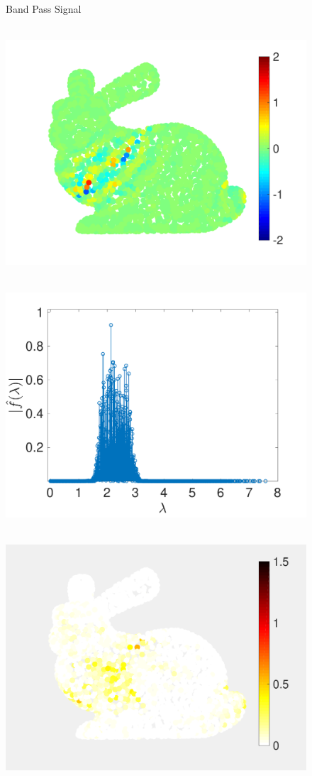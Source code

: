\documentclass[a4paper]{article}
\theoremstyle{definition}
\begin{document}
\begin{figure}[bth]
\begin{minipage}[m]{0.16\linewidth}
\end{minipage}\\
\begin{minipage}[m]{0.16\linewidth}
\centerline{\small{Band Pass Signal}}
\end{minipage}
\begin{minipage}[m]{0.16\linewidth}
\centerline{~~\includegraphics[width=.85\linewidth]{fig_band_pass_signal_bunny}}
\end{minipage}
\begin{minipage}[m]{0.16\linewidth}
\centerline{~~\includegraphics[width=.85\linewidth]{fig_band_pass_signal_spectral_bunny}}
\end{minipage}
\begin{minipage}[m]{0.16\linewidth}
\centerline{~~\includegraphics[width=.85\linewidth]{fig_rational_filter_error_band_pass_bunny}}

\end{minipage}
\end{figure}
\end{document}
